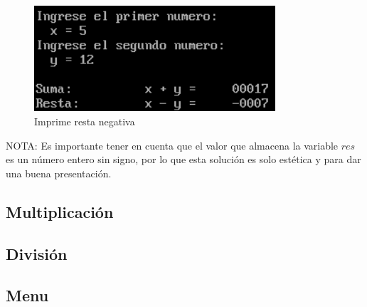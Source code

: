 \documentclass[letter,12 pt,titlepage]{article}
\begin{document}
    \begin{figure}[H]
    \centering
    \includegraphics[width=0.8\textwidth]{img/04.png}
    \caption{Imprime resta negativa}
    \end{figure}

    NOTA: Es importante tener en cuenta que el valor que almacena la variable $res$ es un número entero sin signo, por lo que esta solución es solo estética y para dar una buena presentación.

    \subsection{Multiplicación}
    \subsection{División}
    \subsection{Menu}
    \newpage
\end{document}
